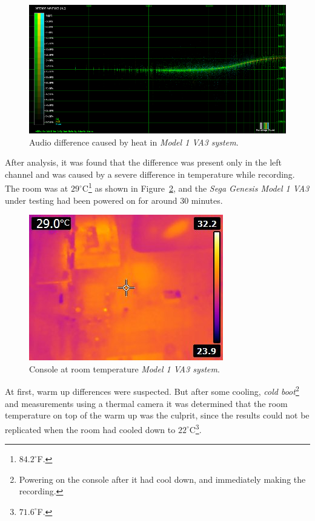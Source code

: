 \documentclass[10pt,a4paper]{report}
\begin{document}
\begin{appendices}
\begin{figure}[H]
	\centering
	\includegraphics[width=1.0\linewidth]{images/heat/0-plotheat.png}
	\caption[Heat Difference]{Audio difference caused by heat in \textit{Model 1 VA3 system}.}
	\label{fig:heatdiff}
\end{figure}

After analysis, it was found that the difference was present only in the left channel and was caused by a severe difference in temperature while recording. The room was at $29^\circ$C\footnote{$84.2^\circ$F.} as shown in Figure~\ref{fig:heatroomtemp}, and the \textit{Sega Genesis Model 1 VA3} under testing had been powered on for around 30 minutes.

\begin{figure}[H]
	\centering
	\includegraphics[width=0.4\linewidth]{images/heat/1-roomtemp.jpg}
	\caption[Room temperature]{Console at room temperature \textit{Model 1 VA3 system}.}
	\label{fig:heatroomtemp}
\end{figure}

At first, warm up differences were suspected. But after some cooling, \textit{cold boot}\footnote{Powering on the console after it had cool down, and immediately making the recording.} and measurements using a thermal camera it was determined that the room temperature on top of the warm up was the culprit, since the results could not be replicated when the room had cooled down to $22^\circ$C\footnote{$71.6^\circ$F.}. 


\end{appendices}
\end{document}
